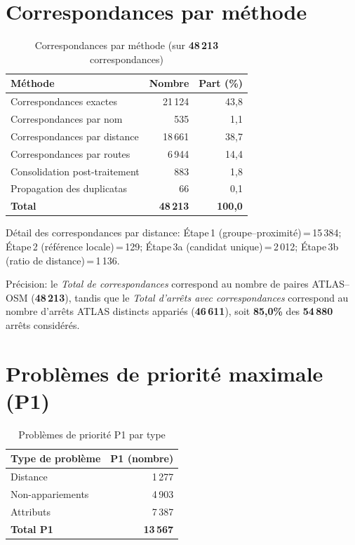 \section*{Correspondances par méthode}
\begin{table}[h]
\centering
\caption{Correspondances par méthode (sur \textbf{48\,213} correspondances)}
\label{tab:matches_by_method_conclusion}
\begin{tabular}{|l|r|r|}
\hline
\textbf{Méthode} & \textbf{Nombre} & \textbf{Part (\%)} \\
\hline
Correspondances exactes & 21\,124 & 43,8 \\
Correspondances par nom & 535 & 1,1 \\
Correspondances par distance & 18\,661 & 38,7 \\
Correspondances par routes & 6\,944 & 14,4 \\
Consolidation post-traitement & 883 & 1,8 \\
Propagation des duplicatas & 66 & 0,1 \\
\hline
\textbf{Total} & \textbf{48\,213} & \textbf{100,0} \\
\hline
\end{tabular}
\end{table}

\noindent\small Détail des correspondances par distance: Étape\,1 (groupe–proximité)\,=\,15\,384; Étape\,2 (référence locale)\,=\,129; Étape\,3a (candidat unique)\,=\,2\,012; Étape\,3b (ratio de distance)\,=\,1\,136.

\noindent\small Précision: le \emph{Total de correspondances} correspond au nombre de paires ATLAS--OSM (\textbf{48\,213}), tandis que le \emph{Total d'arrêts avec correspondances} correspond au nombre d'arrêts ATLAS distincts appariés (\textbf{46\,611}), soit \textbf{85,0\%} des \textbf{54\,880} arrêts considérés.

\vspace{0.5em}
\section*{Problèmes de priorité maximale (P1)}
\begin{table}[h]
\centering
\caption{Problèmes de priorité P1 par type}
\label{tab:p1_problems_conclusion}
\begin{tabular}{|l|r|}
\hline
\textbf{Type de problème} & \textbf{P1 (nombre)} \\
\hline
Distance & 1\,277 \\
Non-appariements & 4\,903 \\
Attributs & 7\,387 \\
\hline
\textbf{Total P1} & \textbf{13\,567} \\
\hline
\end{tabular}
\end{table}

